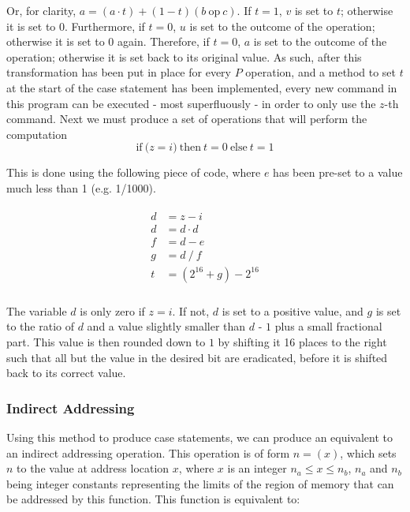 \documentclass[Master.tex]{subfiles}
\begin{document}
Or, for clarity, $a = (a \cdot t) + (1 - t)(b\ \mathrm{op}\ c)$. If $t = 1$, $v$ is set to $t$; otherwise it is set to $0$. Furthermore, if $t = 0$, $u$ is set to the outcome of the operation; otherwise it is set to $0$ again. Therefore, if $t = 0$, $a$ is set to the outcome of the operation; otherwise it is set back to its original value. As such, after this transformation has been put in place for every $P$ operation, and a method to set $t$ at the start of the case statement has been implemented, every new command in this program can be executed - most superfluously - in order to only use the $z$-th command. Next we must produce a set of operations that will perform the computation
\begin{equation*}
\mathrm{if\ (}z = i\mathrm{)\ then\ } t = 0 \mathrm{\ else\ } t = 1
\end{equation*}

This is done using the following piece of code, where $e$ has been pre-set to a value much less than 1 (e.g. 1/1000).

\begin{gather*}
\begin{aligned}
d &= z - i \\
d &= d \cdot d \\
f &= d - e \\
g &= d\ /\ f \\[1ex]
t &= (2^{16} + g) - 2^{16} \\
\end{aligned}
\end{gather*}

The variable $d$ is only zero if $z = i$. If not, $d$ is set to a positive value, and $g$ is set to the ratio of $d$ and a value slightly smaller than $d$ - $1$ plus a small fractional part. This value is then rounded down to $1$ by shifting it 16 places to the right such that all but the value in the desired bit are eradicated, before it is shifted back to its correct value.

\subsubsection{Indirect Addressing}

Using this method to produce case statements, we can produce an equivalent to an indirect addressing operation. This operation is of form $n = (x)$, which sets $n$ to the value at address location $x$, where $x$ is an integer $n_a \leq x \leq n_b$, $n_a$ and $n_b$ being integer constants representing the limits of the region of memory that can be addressed by this function. This function is equivalent to:
\end{document}
